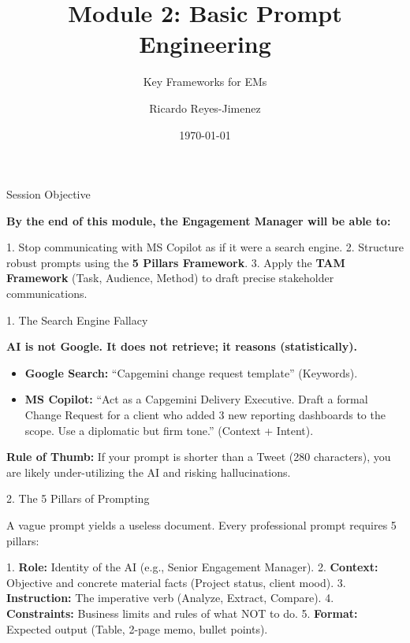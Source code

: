 \documentclass[aspectratio=169]{beamer}
\title[Module 2: Basic Prompt Enginee]{Module 2: Basic Prompt Engineering}
\subtitle{Key Frameworks for EMs}
\author{Ricardo Reyes-Jimenez}
\institute{Capgemini}
\date{\today}
\begin{document}
\begin{frame}
  \titlepage
\end{frame}

\usebackgroundtemplate{}



\begin{frame}[fragile]{Session Objective}


\textbf{By the end of this module, the Engagement Manager will be able to:}

1. Stop communicating with MS Copilot as if it were a search engine.
2. Structure robust prompts using the \textbf{5 Pillars Framework}.
3. Apply the \textbf{TAM Framework} (Task, Audience, Method) to draft precise stakeholder communications.

\end{frame}



\begin{frame}[fragile]{1. The Search Engine Fallacy}


\textbf{AI is not Google. It does not retrieve; it reasons (statistically).}

\begin{itemize}
  \item \textbf{Google Search:} ``Capgemini change request template'' (Keywords).
  \item \textbf{MS Copilot:} ``Act as a Capgemini Delivery Executive. Draft a formal Change Request for a client who added 3 new reporting dashboards to the scope. Use a diplomatic but firm tone.'' (Context + Intent).
\end{itemize}
\textbf{Rule of Thumb:} If your prompt is shorter than a Tweet (280 characters), you are likely under-utilizing the AI and risking hallucinations.

\end{frame}



\begin{frame}[fragile]{2. The 5 Pillars of Prompting}


A vague prompt yields a useless document. Every professional prompt requires 5 pillars:

1. \textbf{Role:} Identity of the AI (e.g., Senior Engagement Manager).
2. \textbf{Context:} Objective and concrete material facts (Project status, client mood).
3. \textbf{Instruction:} The imperative verb (Analyze, Extract, Compare).
4. \textbf{Constraints:} Business limits and rules of what NOT to do.
5. \textbf{Format:} Expected output (Table, 2-page memo, bullet points).

\end{frame}
\end{document}
